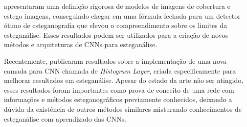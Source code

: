  apresentaram uma definição rigorosa de modelos de imagens de cobertura e estego imagens, conseguindo chegar em uma fórmula fechada para um detector ótimo de esteganografia %
que elevou o compreendimento sobre os limites da esteganálise. Esses resultados podem ser utilizados para a criação de novos métodos e arquiteturas de CNNs para esteganálise.

Recentemente,  publicaram resultados sobre a implementação de uma nova camada para CNN chamada de \textit{Histogram Layer}, criada especificamente para melhorar resultados em esteganálise. Apesar do estado da arte não ser atingido, esses resultados foram importantes como prova de conceito de uma rede com informações e métodos esteganográficos previamente conhecidos, deixando a dúvida da existência de outros métodos similares misturando conhecimentos de esteganálise com aprendizado das CNNs.


